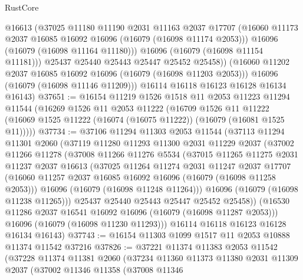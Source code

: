 \begin{lexlean}{RustCore}
\begin{coremodule}
              @16613
              (@37025
                @11180
                @11190
                @2031
                @11163
                @2037
                @17707
                (@16060 @11173 @2037 @16085 @16092 @16096 (@16079 (@16098 @11174 @2053)))
                @16096
                (@16079 (@16098 @11164 @11180)))
              @16096
              (@16079 (@16098 @11154 @11181)))
            @25437
            @25440
            @25443
            @25447
            @25452
            @25458))
        (@16060 @11202 @2037 @16085 @16092 @16096 (@16079 (@16098 @11203 @2053)))
        @16096
        (@16079 (@16098 @11146 @11209)))
      @16114
      @16118
      @16123
      @16128
      @16134
      @16143)
@37651 := @16154
    @11219
    @1526
    @1518
    @11
    @2053
    @11223
    @11294
    @11544
    (@16269
      @1526
      @11
      @2053
      @11222
      (@16709
        @1526
        @11
        @11222
        (@16069 @1525 @11222 (@16074 (@16075 @11222)) (@16079 (@16081 @1525 @11)))))
@37734 := @37106
    @11294
    @11303
    @2053
    @11544
    (@37113
      @11294
      @11301
      @2060
      (@37119
        @11280
        @11293
        @11300
        @2031
        @11229
        @2037
        (@37002
          @11266
          @11278
          (@37008
            @11266
            @11276
            @5534
            (@37015
              @11265
              @11275
              @2031
              @11237
              @2037
              @16613
              (@37025
                @11264
                @11274
                @2031
                @11247
                @2037
                @17707
                (@16060 @11257 @2037 @16085 @16092 @16096 (@16079 (@16098 @11258 @2053)))
                @16096
                (@16079 (@16098 @11248 @11264)))
              @16096
              (@16079 (@16098 @11238 @11265)))
            @25437
            @25440
            @25443
            @25447
            @25452
            @25458))
        (@16530 @11286 @2037 @16541 @16092 @16096 (@16079 (@16098 @11287 @2053)))
        @16096
        (@16079 (@16098 @11230 @11293)))
      @16114
      @16118
      @16123
      @16128
      @16134
      @16143)
@37743 := @16154 @11303 @1099 @1517 @11 @2053 @10888 @11374 @11542 @37216
@37826 := @37221
    @11374
    @11383
    @2053
    @11542
    (@37228
      @11374
      @11381
      @2060
      (@37234
        @11360
        @11373
        @11380
        @2031
        @11309
        @2037
        (@37002
          @11346
          @11358
          (@37008
            @11346

\end{coremodule}
\end{lexlean}

